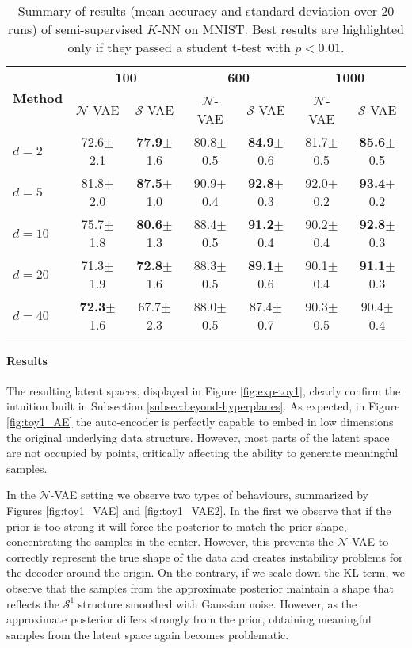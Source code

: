 \documentclass[letterpaper]{article}
\newcommand{\Nv}{$\mathcal{N}$}
\begin{document}
\begin{table*}[!ht]
  \centering
  \caption{Summary of results (mean accuracy and standard-deviation over 20 runs) of semi-supervised $K$-NN on MNIST. Best results are highlighted only if they passed a student t-test with $p<0.01$.}
  \bigskip
  \begin{tabular}{l|cc|cc|cc}
    \toprule
    \multirow{2}{*}{\textbf{Method}} &
    \multicolumn{2}{c}{\textbf{100}} &
    \multicolumn{2}{c}{\textbf{600}} &
    \multicolumn{2}{c}{\textbf{1000}}
        \\
        & $\mathcal{N}$-VAE & $\mathcal{S}$-VAE & $\mathcal{N}$-VAE & $\mathcal{S}$-VAE & $\mathcal{N}$-VAE & $\mathcal{S}$-VAE \\
    \midrule
$d=2$&72.6{\tiny$\pm$2.1}&\textbf{77.9}{\tiny$\pm$1.6}&80.8{\tiny$\pm$0.5}&\textbf{84.9}{\tiny$\pm$0.6}&81.7{\tiny$\pm$0.5}&\textbf{85.6}{\tiny$\pm$0.5}\\
$d=5$&81.8{\tiny$\pm$2.0}&\textbf{87.5}{\tiny$\pm$1.0}&90.9{\tiny$\pm$0.4}&\textbf{92.8}{\tiny$\pm$0.3}&92.0{\tiny$\pm$0.2}&\textbf{93.4}{\tiny$\pm$0.2}\\
$d=10$&75.7{\tiny$\pm$1.8}&\textbf{80.6}{\tiny$\pm$1.3}&88.4{\tiny$\pm$0.5}&\textbf{91.2}{\tiny$\pm$0.4}&90.2{\tiny$\pm$0.4}&\textbf{92.8}{\tiny$\pm$0.3}\\
$d=20$&71.3{\tiny$\pm$1.9}&\textbf{72.8}{\tiny$\pm$1.6}&88.3{\tiny$\pm$0.5}&\textbf{89.1}{\tiny$\pm$0.6}&90.1{\tiny$\pm$0.4}&\textbf{91.1}{\tiny$\pm$0.3}\\
$d=40$&\textbf{72.3}{\tiny$\pm$1.6}&67.7{\tiny$\pm$2.3}&88.0{\tiny$\pm$0.5}&87.4{\tiny$\pm$0.7}&90.3{\tiny$\pm$0.5}&90.4{\tiny$\pm$0.4}\\
    \bottomrule
    \end{tabular}
  \label{tab:m1_k5_a}
\end{table*}


\paragraph{Results}
The resulting latent spaces, displayed in Figure \ref{fig:exp-toy1}, clearly confirm the intuition built in Subsection \ref{subsec:beyond-hyperplanes}. As expected, in Figure \ref{fig:toy1_AE} the auto-encoder is perfectly capable to embed in low dimensions the original underlying data structure. However, most parts of the latent space are not occupied by points, critically affecting the ability to generate meaningful samples.

In the \Nv-VAE setting we observe two types of behaviours, summarized by Figures \ref{fig:toy1_VAE} and  \ref{fig:toy1_VAE2}. In the first we observe that if the prior is too strong it will force the posterior to match the prior shape, concentrating the samples in the center. However, this prevents the \Nv-VAE to correctly represent the true shape of the data and creates instability problems for the decoder around the origin. On the contrary, if we scale down the KL term, we observe that the samples from the approximate posterior maintain a shape that reflects the $\mathcal{S}^1$ structure smoothed with Gaussian noise. However, as the approximate posterior differs strongly from the prior, obtaining meaningful samples from the latent space again becomes problematic. 
\end{document}
